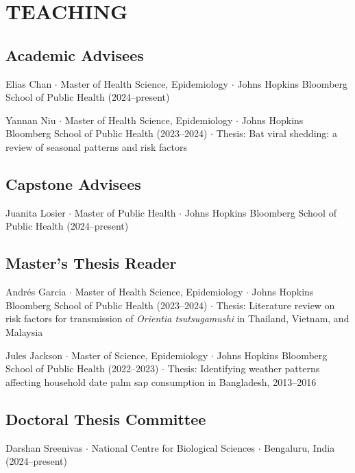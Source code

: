\documentclass{cv}
\begin{document}

\section*{TEACHING}

\subsection*{Academic Advisees}

Elias Chan $\cdot$ Master of Health Science, Epidemiology $\cdot$ Johns Hopkins Bloomberg School of Public Health (2024--present)

Yannan Niu $\cdot$ Master of Health Science, Epidemiology $\cdot$ Johns Hopkins Bloomberg School of Public Health (2023--2024) $\cdot$ Thesis: Bat viral shedding: a review of seasonal patterns and risk factors

\subsection*{Capstone Advisees}

Juanita Losier $\cdot$ Master of Public Health $\cdot$ Johns Hopkins Bloomberg School of Public Health (2024--present)

\subsection*{Master's Thesis Reader}

Andrés Garcia $\cdot$ Master of Health Science, Epidemiology $\cdot$ Johns Hopkins Bloomberg School of Public Health (2023--2024) $\cdot$ Thesis: Literature review on risk factors for transmission of \textit{Orientia tsutsugamushi} in Thailand, Vietnam, and Malaysia

Jules Jackson $\cdot$ Master of Science, Epidemiology $\cdot$ Johns Hopkins Bloomberg School of Public Health (2022--2023) $\cdot$ Thesis: Identifying weather patterns affecting household date palm sap consumption in Bangladesh, 2013--2016

\subsection*{Doctoral Thesis Committee}

Darshan Sreenivas $\cdot$ National Centre for Biological Sciences $\cdot$ Bengaluru, India (2024--present)
\end{document}
